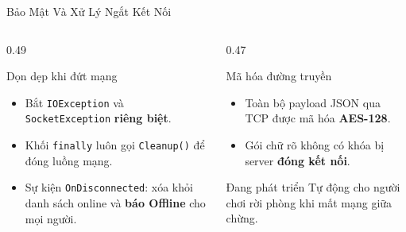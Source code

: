 \begin{frame}{Bảo Mật Và Xử Lý Ngắt Kết Nối}
  \begin{columns}[T]
    \begin{column}{0.49\textwidth}
      \begin{block}{Dọn dẹp khi đứt mạng}
        \begin{itemize}
          \item Bắt \texttt{IOException} và \texttt{SocketException} \textbf{riêng biệt}.
          \item Khối \texttt{finally} luôn gọi \texttt{Cleanup()} để đóng luồng mạng.
          \item Sự kiện \texttt{OnDisconnected}: xóa khỏi danh sách online và \textbf{báo Offline} cho mọi người.
        \end{itemize}
      \end{block}
    \end{column}
    \begin{column}{0.47\textwidth}
      \begin{exampleblock}{Mã hóa đường truyền}
        \begin{itemize}
          \item Toàn bộ payload JSON qua TCP được mã hóa \textbf{AES-128}.
          \item Gói chữ rõ không có khóa bị server \textbf{đóng kết nối}.
        \end{itemize}
      \end{exampleblock}
      \begin{alertblock}{Đang phát triển}
        \footnotesize Tự động cho người chơi rời phòng khi mất mạng giữa chừng.
      \end{alertblock}
    \end{column}
  \end{columns}
\end{frame}
